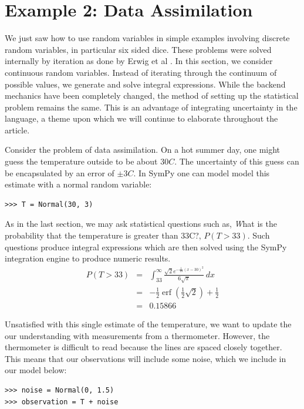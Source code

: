 \section{Example 2: Data Assimilation}

We just saw how to use random variables in simple examples involving
discrete random variables, in particular six sided dice. These problems were
solved internally by iteration as done by Erwig et al \cite{Erwig2006}. In this
section, we consider continuous random variables. Instead of iterating through
the continuum of possible values, we generate and solve integral expressions.
 While the backend mechanics have been completely changed, the
method of setting up the statistical problem remains the same. This is an
advantage of integrating uncertainty in the language, a theme upon which we
will continue to elaborate throughout the article.

Consider the problem of data assimilation. On a hot summer day, one might guess
the temperature outside to be about $30C$. The uncertainty of this guess can be
encapsulated by an error of $\pm3C$. In SymPy one can model model this estimate
with a normal random variable:

\begin{lstlisting}
>>> T = Normal(30, 3)
\end{lstlisting}

As in the last section, we may ask statistical questions such as, {\emph What is the
probability that the temperature is greater than 33C?}, $P(T>33)$. Such
questions produce integral expressions which are then solved using the SymPy
integration engine to produce numeric results.
\begin{eqnarray*}
P(T>33) & = & \int_{33}^{\infty} \frac{\sqrt{2} e^{- \frac{1}{18} \left(x -30\right)^{2}}}{6 \sqrt{\pi}}\, dx \\
& = & - \frac{1}{2} \operatorname{erf}{\left (\frac{1}{2} \sqrt{2} \right )} + \frac{1}{2} \\
& = & 0.15866
\end{eqnarray*}

Unsatisfied with this single estimate of the temperature, we want to update the
our understanding with measurements from a thermometer. However, the thermometer is difficult to read because the lines are spaced closely
together.  This means that our observations will include some noise, which we
include in our model below:

\begin{lstlisting}
>>> noise = Normal(0, 1.5)
>>> observation = T + noise
\end{lstlisting}

